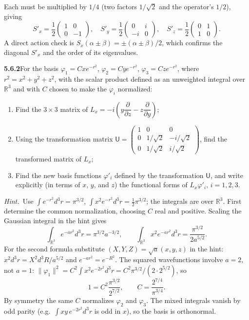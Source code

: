 Each must be multiplied by $1/4$ (two factors $1/\sqrt2$ and the
operator's $1/2$), giving
\[
\boxed{S'_x=\frac12\begin{pmatrix}1&0\\0&-1\end{pmatrix},\quad
S'_y=\frac12\begin{pmatrix}0&i\\-i&0\end{pmatrix},\quad
S'_z=\frac12\begin{pmatrix}0&1\\1&0\end{pmatrix}.}
\]
A direct action check is $S_x(\alpha\pm\beta)=\pm(\alpha\pm\beta)/2$,
which confirms the diagonal $S'_x$ and the order of its eigenvalues.

\par\bigskip
\noindent\textbf{5.6.2}\quad For the basis $\varphi_{1}=Cxe^{-r^{2}}$,
$\varphi_{2}=Cye^{-r^{2}}$, $\varphi_{3}=Cze^{-r^{2}}$, where
$r^{2}=x^{2}+y^{2}+z^{2}$, with the scalar product defined as an unweighted
integral over $\mathbb{R}^{3}$ and with $C$ chosen to make the $\varphi_{i}$
normalized:
\begin{enumerate}
\item[(a)] Find the $3\times3$ matrix of
  $L_{x}=-i\left(y\dfrac{\partial}{\partial z}-z\dfrac{\partial}{\partial y}
  \right)$;
\item[(b)] Using the transformation matrix
  $\mathsf{U}=\begin{pmatrix}1&0&0\\0&1/\sqrt{2}&-i/\sqrt{2}\\
  0&1/\sqrt{2}&i/\sqrt{2}\end{pmatrix}$, find the transformed matrix of
  $L_{x}$;
\item[(c)] Find the new basis functions $\varphi'_{i}$ defined by the
  transformation $\mathsf{U}$, and write explicitly (in terms of $x$, $y$, and
  $z$) the functional forms of $L_{x}\varphi'_{i}$, $i=1,2,3$.
\end{enumerate}
\emph{Hint.}~Use $\int e^{-r^{2}}d^{3}r=\pi^{3/2}$,
$\int x^{2}e^{-r^{2}}d^{3}r=\frac{1}{2}\pi^{3/2}$; the integrals are over
$\mathbb{R}^{3}$.
\solution
First determine the common normalization, choosing $C$ real and positive. Scaling the Gaussian integral
in the hint gives
\[
\int_{\mathbb R^3}e^{-ar^2}d^3r=\pi^{3/2}a^{-3/2},\qquad
\int_{\mathbb R^3}x^2e^{-ar^2}d^3r=\frac{\pi^{3/2}}{2a^{5/2}}.
\]
For the second formula substitute $(X,Y,Z)=\sqrt a(x,y,z)$ in the
hint: $x^2d^3r=X^2d^3R/a^{5/2}$ and $e^{-ar^2}=e^{-R^2}$. The squared
wavefunctions involve $a=2$, not $a=1$:
$\|\varphi_1\|^2=C^2\int x^2e^{-2r^2}d^3r=C^2\pi^{3/2}/(2\cdot2^{5/2})$,
so
\[
1=C^2\frac{\pi^{3/2}}{2^{7/2}},\qquad
\boxed{C=\frac{2^{7/4}}{\pi^{3/4}}}.
\]
By symmetry the same $C$ normalizes $\varphi_2$ and $\varphi_3$. The
mixed integrals vanish by odd parity (e.g.\ $\int xy\,e^{-2r^2}d^3r$
is odd in $x$), so the basis is orthonormal.

